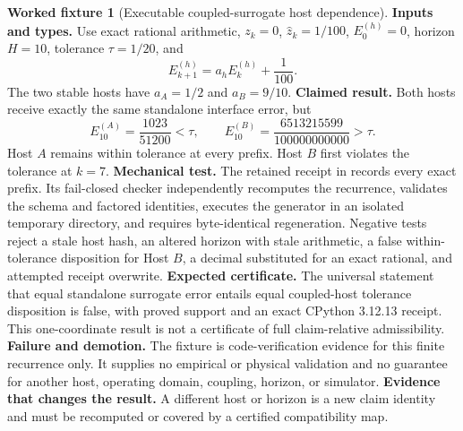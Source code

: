 \documentclass[11pt,a4paper]{article}
\theoremstyle{definition}
\newtheorem{fixture}[definition]{Worked fixture}
\theoremstyle{plain}
\theoremstyle{remark}
\begin{document}
\begin{fixture}[Executable coupled-surrogate host dependence]
\label{fix:coupled-surrogate}
\textbf{Inputs and types.}
Use exact rational arithmetic, \(z_k=0\),
\(\widehat z_k=1/100\), \(E_0^{(h)}=0\), horizon \(H=10\), tolerance
\(\tau=1/20\), and
\[
E_{k+1}^{(h)}=a_hE_k^{(h)}+\frac1{100}.
\]
The two stable hosts have \(a_A=1/2\) and \(a_B=9/10\).
\textbf{Claimed result.}
Both hosts receive exactly the same standalone interface error, but
\[
E_{10}^{(A)}=\frac{1023}{51200}<\tau,
\qquad
E_{10}^{(B)}
=\frac{6513215599}{100000000000}>\tau.
\]
Host \(A\) remains within tolerance at every prefix.  Host \(B\) first
violates the tolerance at \(k=7\).
\textbf{Mechanical test.}
The retained receipt in
 records every exact prefix.  Its
fail-closed checker independently recomputes the recurrence, validates the
schema and factored identities, executes the generator in an isolated
temporary directory, and requires byte-identical regeneration.  Negative
tests reject a stale host hash, an altered horizon with stale arithmetic, a
false within-tolerance disposition for Host \(B\), a decimal substituted for
an exact rational, and attempted receipt overwrite.
\textbf{Expected certificate.}
The universal statement that equal standalone surrogate error entails equal
coupled-host tolerance disposition is false, with proved support and an exact
CPython 3.12.13 receipt.  This one-coordinate result is not a certificate of
full claim-relative admissibility.
\textbf{Failure and demotion.}
The fixture is code-verification evidence for this finite recurrence only.
It supplies no empirical or physical validation and no guarantee for another
host, operating domain, coupling, horizon, or simulator.
\textbf{Evidence that changes the result.}
A different host or horizon is a new claim identity and must be recomputed or
covered by a certified compatibility map.
\end{fixture}
\end{document}
